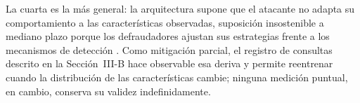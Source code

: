 La cuarta es la más general: la arquitectura supone que el atacante no adapta su
comportamiento a las características observadas, suposición insostenible a mediano plazo
porque los defraudadores ajustan sus estrategias frente a los mecanismos de detección
\cite{ref28}. Como mitigación parcial, el registro de consultas descrito en la Sección~III-B
hace observable esa deriva y permite reentrenar cuando la distribución de las características
cambie; ninguna medición puntual, en cambio, conserva su validez indefinidamente.
